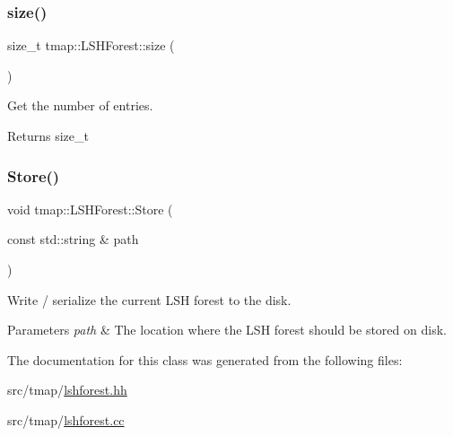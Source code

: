 \subsubsection{\texorpdfstring{size()}{size()}}
{\footnotesize\ttfamily size\+\_\+t tmap\+::\+L\+S\+H\+Forest\+::size (\begin{DoxyParamCaption}{ }\end{DoxyParamCaption})}



Get the number of entries. 

\begin{DoxyReturn}{Returns}
size\+\_\+t 
\end{DoxyReturn}
\mbox{\label{classtmap_1_1LSHForest_a1731bf94cd09e7ebc4a10dd42145dc51}} 
\subsubsection{\texorpdfstring{Store()}{Store()}}
{\footnotesize\ttfamily void tmap\+::\+L\+S\+H\+Forest\+::\+Store (\begin{DoxyParamCaption}\item[{const std\+::string \&}]{path }\end{DoxyParamCaption})}



Write / serialize the current L\+SH forest to the disk. 


\begin{DoxyParams}{Parameters}
{\em path} & The location where the L\+SH forest should be stored on disk. \\
\hline
\end{DoxyParams}


The documentation for this class was generated from the following files\+:\begin{DoxyCompactItemize}
\item 
src/tmap/\hyperlink{lshforest_8hh}{lshforest.\+hh}\item 
src/tmap/\hyperlink{lshforest_8cc}{lshforest.\+cc}\end{DoxyCompactItemize}
